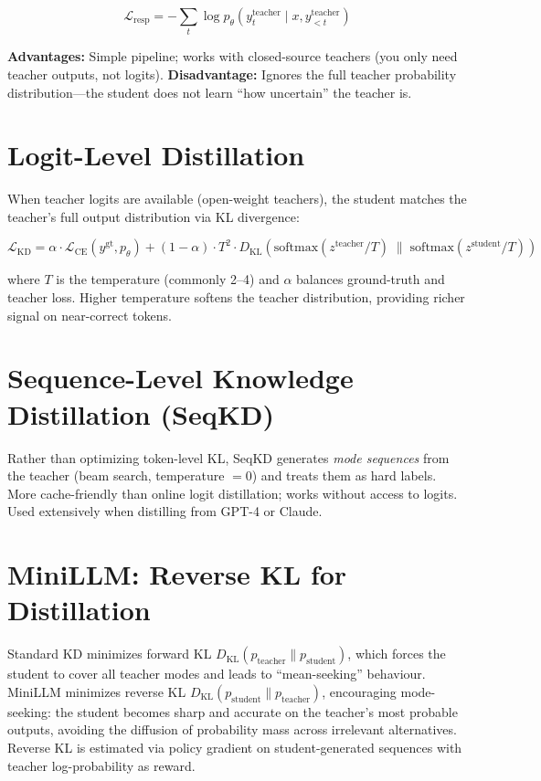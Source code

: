 \[
\mathcal{L}_\text{resp} = -\sum_t \log p_\theta(y_t^\text{teacher} \mid x, y_{<t}^\text{teacher})
\]

\textbf{Advantages:} Simple pipeline; works with closed-source teachers (you only need teacher outputs, not logits). \textbf{Disadvantage:} Ignores the full teacher probability distribution---the student does not learn ``how uncertain'' the teacher is.

\section{Logit-Level Distillation}

When teacher logits are available (open-weight teachers), the student matches the teacher's full output distribution via KL divergence:

\[
\mathcal{L}_\text{KD} = \alpha \cdot \mathcal{L}_\text{CE}(y^\text{gt}, p_\theta) + (1-\alpha) \cdot T^2 \cdot D_\text{KL}\!\left(\text{softmax}(z^\text{teacher}/T) \;\|\; \text{softmax}(z^\text{student}/T)\right)
\]

where $T$ is the temperature (commonly 2--4) and $\alpha$ balances ground-truth and teacher loss. Higher temperature softens the teacher distribution, providing richer signal on near-correct tokens.

\section{Sequence-Level Knowledge Distillation (SeqKD)}

Rather than optimizing token-level KL, SeqKD \parencite{kim2016sequence} generates \emph{mode sequences} from the teacher (beam search, temperature $= 0$) and treats them as hard labels. More cache-friendly than online logit distillation; works without access to logits. Used extensively when distilling from GPT-4 or Claude.

\section{MiniLLM: Reverse KL for Distillation}

Standard KD minimizes forward KL $D_\text{KL}(p_\text{teacher} \| p_\text{student})$, which forces the student to cover all teacher modes and leads to ``mean-seeking'' behaviour. MiniLLM \parencite{gu2024minillm} minimizes reverse KL $D_\text{KL}(p_\text{student} \| p_\text{teacher})$, encouraging mode-seeking: the student becomes sharp and accurate on the teacher's most probable outputs, avoiding the diffusion of probability mass across irrelevant alternatives. Reverse KL is estimated via policy gradient on student-generated sequences with teacher log-probability as reward.


